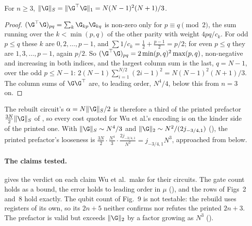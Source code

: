 \begin{lemma}[Wu et al.'s norm of $\G$]
\label{lem:G-paper-norm}
For $n\ge3$, $\|\G\|_S=\|\G^{\top}\G\|_1=N(N-1)^2(N+1)/3$.
\end{lemma}
\begin{proof}
$(\G^{\top}\G)_{pq}=\sum_k\G_{kp}\G_{kq}$ is non-zero only for $p\equiv q\pmod 2$, the sum running over the $k<\min(p,q)$ of the other parity with weight $4pq/c_k$. For odd $p\le q$ these $k$ are $0,2,\dots,p-1$, and $\sum1/c_k=\tfrac12+\tfrac{p-1}{2}=p/2$; for even $p\le q$ they are $1,3,\dots,p-1$, again $p/2$. So $(\G^{\top}\G)_{pq}=2\min(p,q)^2\max(p,q)$, non-negative and increasing in both indices, and the largest column sum is the last, $q=N-1$, over the odd $p\le N-1$: $2(N-1)\sum_{i=1}^{N/2}(2i-1)^2=N(N-1)^2(N+1)/3$. The column sums of $\G\G^{\top}$ are, to leading order, $N^4/4$, below this from $n=3$ on.
\end{proof}

The rebuilt circuit's $\alpha=N\|\G\|_S/2$ is therefore a third of the printed prefactor $\tfrac{3N}{2}\|\G\|_S$ of , so every cost quoted for Wu et al.'s encoding is on the kinder side of the printed one. With $\|\G\|_S\sim N^4/3$ and $\|\G\|_2\sim N^2/(2j_{-3/4,1})$ (), the printed prefactor's looseness is $\tfrac{3N}{2}\cdot\tfrac{N^4}{3}\cdot\tfrac{2j_{-3/4,1}}{N^2}=j_{-3/4,1}N^3$, approached from below.

\paragraph{The claims tested.}  gives the verdict on each claim Wu et al.\ make for their circuits. The gate count holds as a bound, the error holds to leading order in $\mu$ (), and the rows of Figs~2 and~8 hold exactly. The qubit count of Fig.~9 is not testable: the rebuild uses registers of its own, so its $2n+5$ neither confirms nor refutes the printed $2n+3$. The prefactor is valid but exceeds $\|\G\|_2$ by a factor growing as $N^3$ ().

